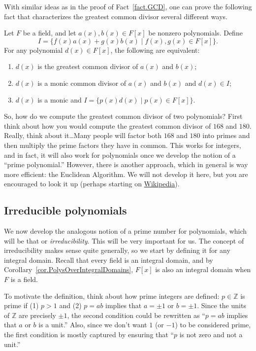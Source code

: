 With similar ideas as in the proof of Fact~\ref{fact.GCD}, one can prove the following fact that characterizes the greatest common divisor several different ways.

\begin{fact}
Let $F$ be a field, and let $a(x), b(x)\in F[x]$ be nonzero polynomials. Define \[I = \{f(x)a(x) + g(x)b(x)\mid f(x),g(x)\in F[x]\}.\]
For any polynomial $d(x)\in F[x]$, the following are equivalent:
\begin{enumerate}
\item $d(x)$ is the greatest common divisor of $a(x)$ and $b(x)$;
\item $d(x)$ is a monic common divisor of $a(x)$ and $b(x)$ and $d(x) \in I$;
\item $d(x)$ is a monic and $I = \{p(x)d(x)\mid p(x)\in F[x]\}$.
\end{enumerate}
\end{fact}

So, how do we compute the greatest common divisor of two polynomials? First think about how you would compute the greatest common divisor of $168$ and $180$. Really, think about it\ldots Many people will factor both  $168$ and $180$ into primes and then multiply the prime factors they have in common. This works for integers, and in fact, it will also work for polynomials once we develop the notion of a ``prime polynomial.'' However, there is another approach, which in general is way more efficient: the Euclidean Algorithm. We will not develop it here, but you are encouraged to look it up (perhaps starting on \href{https://en.wikipedia.org/wiki/Polynomial_greatest_common_divisor}{Wikipedia}).

\subsection{Irreducible polynomials}
We now develop the analogous notion of a prime number for polynomials, which will be that or \emph{irreducibility}. This will be very important for us. The concept of irreducibility makes sense quite generally, so we start by defining it for any integral domain. Recall that every field is an integral domain, and by Corollary~\ref{cor.PolysOverIntegralDomains}, $F[x]$ is also an integral domain when $F$ is a field. 

To motivate the definition, think about how prime integers are defined: $p\in \mathbb{Z}$ is prime if (1) $p>1$ and (2) $p=ab$ implies that $a=\pm 1$ or $b=\pm1$. Since the  units of $\mathbb{Z}$ are precisely $\pm1$, the second condition could be rewritten as ``$p=ab$ implies that $a$ or $b$ is a unit.'' Also, since we don't  want $1$ (or $-1$) to be considered prime, the first condition is mostly captured by ensuring that ``$p$ is not zero and not a unit.'' 

